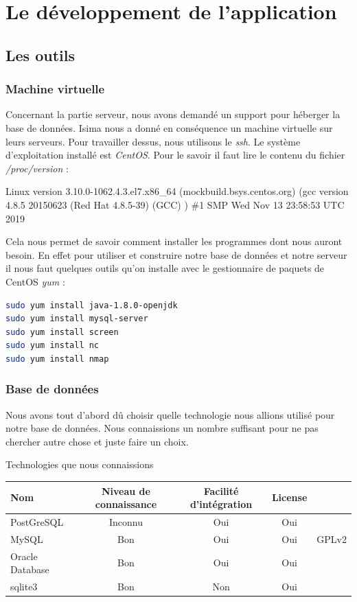 
\section{Le développement de l'application}
\subsection{Les outils}
\subsubsection{Machine virtuelle}
Concernant la partie serveur, nous avons demandé un support pour héberger la base de données. Isima nous a donné en conséquence un machine
virtuelle sur leurs serveurs. Pour travailler dessus, nous utilisons le \emph{ssh}. Le système d'exploitation installé est \emph{CentOS}.
Pour le savoir il faut lire le contenu du fichier \emph{/proc/version} :
\begin{mdframed}[backgroundcolor=light-gray, roundcorner=20pt,
    leftmargin=0, rightmargin=0, 
    innerleftmargin=20, linecolor=darkgray]
    Linux version 3.10.0-1062.4.3.el7.x86\_64 (mockbuild\@kbuilder.bsys.centos.org) (gcc version 4.8.5 20150623 (Red Hat 4.8.5-39) (GCC) ) \#1 SMP Wed Nov 13 23:58:53 UTC 2019
\end{mdframed}

Cela nous permet de savoir comment installer les programmes dont nous auront besoin. En effet pour utiliser et construire notre base de données
et notre serveur il nous faut quelques outils qu'on installe avec le gestionnaire de paquets de CentOS \emph{yum} :
\begin{lstlisting}[language=bash]
sudo yum install java-1.8.0-openjdk
sudo yum install mysql-server
sudo yum install screen
sudo yum install nc
sudo yum install nmap
\end{lstlisting}

\subsubsection{Base de données}
Nous avons tout d'abord dû choisir quelle technologie nous allions utilisé pour notre base de données.
Nous connaissions un nombre suffisant pour ne pas chercher autre chose et juste faire un choix.
\par
\begin{center}
    Technologies que nous connaissions
    \par
    \begin{tabular}{|l|c|c|c|c|}
        \hline
        Nom & Niveau de connaissance & Facilité d'intégration & License & \\
        \hline
        PostGreSQL & Inconnu & Oui & Oui &\\
        \hline
        MySQL & Bon & Oui & Oui & GPLv2\\
        \hline
        Oracle Database & Bon & Oui & Oui & \\
        \hline
        sqlite3 & Bon & Non & Oui & \\
        \hline
    \end{tabular}
\end{center}

